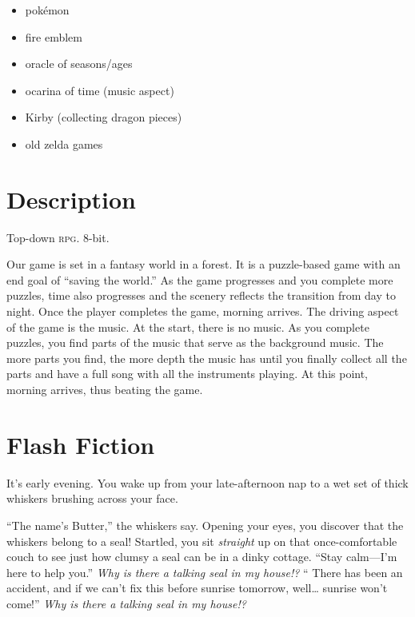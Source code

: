 \documentclass{article}
\begin{document}
\begin{itemize}
\item pok\'emon
\item fire emblem
\item oracle of seasons\slash ages
\item ocarina of time (music aspect)
\item Kirby (collecting dragon pieces)
\item old zelda games
\end{itemize}

\section{Description}
\label{sec:description}

Top-down \textsc{rpg}.
8-bit.

Our game is set in a fantasy world in a forest.
It is a puzzle-based game with an end goal of \enquote{saving the world.}
As the game progresses and you complete more puzzles,
  time also progresses and the scenery reflects the transition from day to night.
Once the player completes the game, morning arrives.
The driving aspect of the game is the music.
At the start, there is no music.
As you complete puzzles, you find parts of the music that serve as the background
music.
The more parts you find, the more depth the music has until you finally collect all the parts and have a full song with all the instruments playing.
At this point, morning arrives, thus beating the game.


\newpage

\section{Flash Fiction}
\label{sec:flash-fiction}

\def\thought{\textsl}

It's early evening.
You wake up from your late-afternoon nap to
  a wet set of thick whiskers
  brushing across your face.

\enquote{The name's Butter,} the whiskers say.
Opening your eyes, you discover that the whiskers belong to a seal!
Startled, you sit \emph{straight} up on that once-comfortable couch
  to see just how clumsy a seal can be in a dinky cottage.
\enquote{Stay calm---I'm here to help you.}
\thought{Why is there a talking seal in my house!?}
\enquote{%
  There has been an accident, and
  if we can't fix this before sunrise tomorrow, well\dots
  sunrise won't come!}
\thought{Why is there a talking seal in my house!?}
\end{document}
